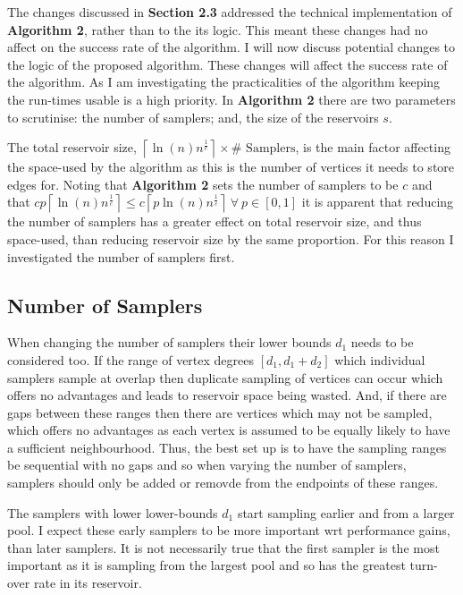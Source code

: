 \documentclass[11pt,twoside,a4paper]{report}
\begin{document}
\par The changes discussed in \textbf{Section 2.3} addressed the technical implementation of \textbf{Algorithm 2}, rather than to the its logic. This meant these changes had no affect on the success rate of the algorithm. I will now discuss potential changes to the logic of the proposed algorithm. These changes will affect the success rate of the algorithm. As I am investigating the practicalities of the algorithm keeping the run-times usable is a high priority. In \textbf{Algorithm 2} there are two parameters to scrutinise: the number of samplers; and, the size of the reservoirs $s$.

\par The total reservoir size, $\left\lceil\ln(n)n^{\frac1c}\right\rceil\times\text{\#\ Samplers}$, is the main factor affecting the space-used by the algorithm as this is the number of vertices it needs to store edges for. Noting that \textbf{Algorithm 2} sets the number of samplers to be $c$ and that $cp\left\lceil\ln(n)n^{\frac1c}\right\rceil\leq c\left\lceil p\ln(n)n^{\frac1c}\right\rceil\ \forall\ p\in[0,1]$ it is apparent that reducing the number of samplers has a greater effect on total reservoir size, and thus space-used, than reducing reservoir size by the same proportion. For this reason I investigated the number of samplers first.

\subsection{Number of Samplers}

\par When changing the number of samplers their lower bounds $d_1$ needs to be considered too. If the range of vertex degrees $[d_1,d_1+d_2]$ which individual samplers sample at overlap then duplicate sampling of vertices can occur which offers no advantages and leads to reservoir space being wasted. And, if there are gaps between these ranges then there are vertices which may not be sampled, which offers no advantages as each vertex is assumed to be equally likely to have a sufficient neighbourhood.
Thus, the best set up is to have the sampling ranges be sequential with no gaps and so when varying the number of samplers, samplers should only be added or removde from the endpoints of these ranges.

\par The samplers with lower lower-bounds $d_1$ start sampling earlier and from a larger pool. I expect these early samplers to be more important wrt performance gains, than later samplers. It is not necessarily true that the first sampler is the most important as it is sampling from the largest pool and so has the greatest turn-over rate in its reservoir.
\end{document}
